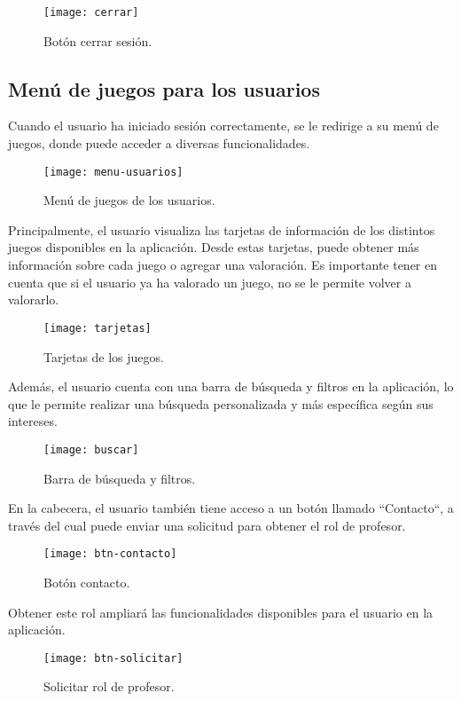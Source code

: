 \begin{figure}[htb]
\centering
\texttt{[image: cerrar]}
\caption{Botón cerrar sesión.}
\label{fig:cerrar}
\end{figure}
\newpage

\subsection{Menú de juegos para los usuarios}
Cuando el usuario ha iniciado sesión correctamente, se le redirige a su menú de juegos, donde puede acceder a diversas funcionalidades.
\begin{figure}[htb]
\centering
\texttt{[image: menu-usuarios]}
\caption{Menú de juegos de los usuarios.}
\label{fig:menu-usuarios}
\end{figure}

Principalmente, el usuario visualiza las tarjetas de información de los distintos juegos disponibles en la aplicación. Desde estas tarjetas, puede obtener más información sobre cada juego o agregar una valoración. Es importante tener en cuenta que si el usuario ya ha valorado un juego, no se le permite volver a valorarlo.
\begin{figure}[htb]
\centering
\texttt{[image: tarjetas]}
\caption{Tarjetas de los juegos.}
\label{fig:tarjetas}
\end{figure}

Además, el usuario cuenta con una barra de búsqueda y filtros en la aplicación, lo que le permite realizar una búsqueda personalizada y más específica según sus intereses.
\begin{figure}[htb]
\centering
\texttt{[image: buscar]}
\caption{Barra de búsqueda y filtros.}
\label{fig:buscar}
\end{figure}

En la cabecera, el usuario también tiene acceso a un botón llamado ``Contacto``, a través del cual puede enviar una solicitud para obtener el rol de profesor. 
\begin{figure}[htb]
\centering
\texttt{[image: btn-contacto]}
\caption{Botón contacto.}
\label{fig:btn-contacto}
\end{figure}

Obtener este rol ampliará las funcionalidades disponibles para el usuario en la aplicación. 

\begin{figure}[htb]
\centering
\texttt{[image: btn-solicitar]}
\caption{Solicitar rol de profesor.}
\label{fig:btn-solicitar}
\end{figure}

